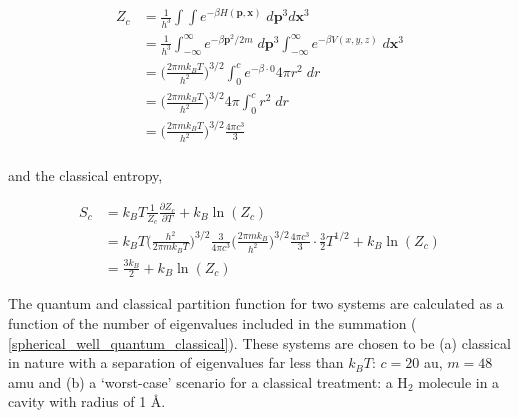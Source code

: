 \documentclass[../main.tex]{subfiles}
\begin{document}
\begin{equation}
\begin{aligned}
Z_c &= \frac{1}{h^{3}}\int\int e^{-\beta H(\boldsymbol{p}, \boldsymbol{x})} \; d\boldsymbol{p}^{3} d\boldsymbol{x}^{3} \\
&= \frac{1}{h^{3}}\int_{-\infty}^\infty e^{-\beta \boldsymbol{p}^2/2m} \; d\boldsymbol{p}^{3} \int_{-\infty}^\infty e^{-\beta V(x, y, z)} \;  d\boldsymbol{x}^{3} \\
&= {\Big (} \frac{2\pi m k_B T}{h^2} {\Big )}^{3/2}  \int_0^c e^{-\beta \cdot 0}  4\pi r^2\;  dr \\
&= {\Big (} \frac{2\pi m k_B T}{h^2} {\Big )}^{3/2}  4\pi \int_0^c r^2\;  dr \\
&= {\Big (} \frac{2\pi m k_B T}{h^2} {\Big )}^{3/2} \frac{4\pi c^3}{3} \\
\end{aligned}
\end{equation}

and the classical entropy,

\begin{equation}
\begin{aligned}
S_c &= k_B T \frac{1}{Z_c} \frac{\partial Z_c}{\partial T} + k_B \ln(Z_c) \\
&= k_B T {\Big (} \frac{h^2}{2\pi m k_B T} {\Big )}^{3/2} \frac{3}{4\pi c^3} {\Big (} \frac{2\pi m k_B}{h^2} {\Big )}^{3/2} \frac{4\pi c^3}{3}\cdot \frac{3}{2}T^{1/2} + k_B \ln(Z_c) \\
&= \frac{3k_B}{2} + k_B \ln(Z_c)
\end{aligned}
\end{equation}

The quantum and classical partition function for two systems are calculated as a function of the number of eigenvalues included in the summation (\figurename{ \ref{spherical_well_quantum_classical}}). These systems are chosen to be (a) classical in nature with a separation of eigenvalues far less than $k_BT$: $c = 20$ au, $m = 48$ amu and (b) a `worst-case' scenario for a classical treatment: a H$_2$ molecule in a cavity with radius of 1 \AA.
\end{document}
